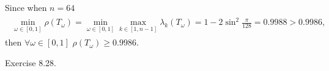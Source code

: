 \documentclass{homework}
\begin{document}
	Since when $n = 64$
	\begin{eqnarray}
		\begin{aligned}
			\min_{\omega\in[0,1]}\rho(T_\omega) = \min_{\omega\in[0,1]} \max_{k\in[1,n-1]} \lambda_k(T_\omega) = 1 - 2\sin^2 \frac{\pi}{128}
			= 0.9988 > 0.9986,
		\end{aligned}
	\end{eqnarray}
	then $\forall \omega\in[0,1]$ $\rho(T_\omega) \geq 0.9986$.
	
\question Exercise 8.28.

	
\end{document}
